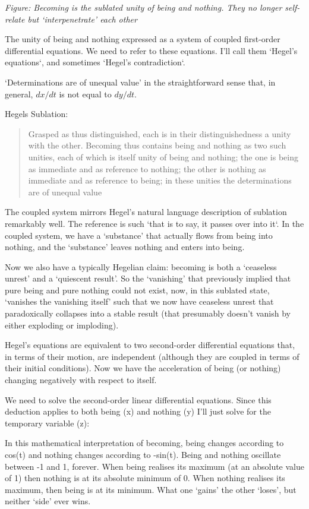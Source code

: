 \documentclass[
]{book}
\begin{document}
\emph{Figure: Becoming is the sublated unity of being and nothing. They no longer self-relate but `interpenetrate' each other}

The unity of being and nothing expressed as a system of coupled first-order differential equations. We need to refer to these equations. I'll call them `Hegel's equations`, and sometimes `Hegel's contradiction`.

`Determinations are of unequal value' in the straightforward sense that, in general,
\(dx/dt\) is not equal to \(dy/dt\).

Hegels Sublation:

\begin{quote}
Grasped as thus distinguished, each is in their distinguishedness a unity with the other. Becoming thus contains being and nothing as two such unities, each of which is itself unity of being and nothing; the one is being as immediate and as reference to nothing; the other is nothing as immediate and as reference to being; in these unities the determinations are of unequal value
\end{quote}

The coupled system mirrors Hegel's natural language description of sublation
remarkably well.
The reference is such `that is to say, it passes over into it`.
In the coupled system, we have a `substance' that actually
flows from being into nothing, and the `substance'
leaves nothing and enters into being.

Now we also have a typically Hegelian claim: becoming is both a `ceaseless unrest' and a `quiescent result'. So the `vanishing' that previously implied that pure being and pure nothing could not exist, now, in this sublated state, `vanishes the vanishing itself' such that we now have ceaseless unrest that paradoxically collapses into a stable result (that presumably doesn't vanish by either exploding or imploding).

Hegel's equations are equivalent to two second-order differential equations that, in terms of their motion, are independent (although they are coupled in terms of their initial conditions).
Now we have the acceleration of being (or nothing) changing negatively with respect to itself.

We need to solve the second-order linear differential equations. Since this deduction applies to both being (x) and nothing (y) I'll just solve for the temporary variable (z):

In this mathematical interpretation of becoming, being changes according to cos(t) and nothing changes according to -sin(t).
Being and nothing oscillate between -1 and 1, forever.
When being realises its maximum (at an absolute value of 1) then nothing is at its absolute minimum of 0. When nothing realises its maximum, then being is at its minimum. What one `gains' the other `loses', but neither `side' ever wins.
\end{document}
